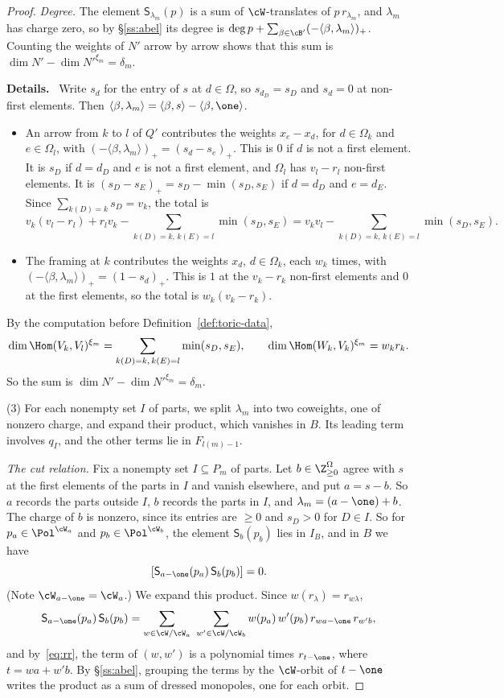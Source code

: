 \documentclass[11pt]{amsart}
\newenvironment{details}{\par\color{black!60!green}\noindent\textbf{Details.}\ }{\par}
\begin{document}
\begin{proof}
\emph{Degree.}  The element $\mathsf S_{\lambda_m}(p)$ is a sum of $\cW$-translates of
$p\,r_{\lambda_m}$, and $\lambda_m$ has charge zero, so by \S\ref{ss:abel}
its degree is $\deg p+\sum_{\beta\in\cB'}(-\langle\beta,\lambda_m\rangle)_+$.
Counting the weights of $N'$ arrow by arrow shows that this sum is
$\dim N'-\dim N'^{\xi_m}=\delta_m$.
\begin{details}
Write $s_d$ for the entry of $s$ at $d\in\Omega$, so $s_{d_D}=s_D$ and $s_d=0$
at non-first elements.  Then $\langle\beta,\lambda_m\rangle
=\langle\beta,s\rangle-\langle\beta,\one\rangle$.
\begin{itemize}[leftmargin=2em]
\item An arrow from $k$ to $l$ of $Q'$ contributes the weights $x_e-x_d$, for
$d\in\Omega_k$ and $e\in\Omega_l$, with
$(-\langle\beta,\lambda_m\rangle)_+=(s_d-s_e)_+$.  This is $0$ if $d$ is not
a first element.  It is $s_D$ if $d=d_D$ and $e$ is not a first element, and
$\Omega_l$ has $v_l-r_l$ non-first elements.  It is
$(s_D-s_E)_+=s_D-\min(s_D,s_E)$ if $d=d_D$ and $e=d_E$.  Since
$\sum_{k(D)=k}s_D=v_k$, the total is
\[
 v_k(v_l-r_l)+r_lv_k-\sum_{k(D)=k,\,k(E)=l}\min(s_D,s_E)
 =v_kv_l-\sum_{k(D)=k,\,k(E)=l}\min(s_D,s_E).
\]
\item The framing at $k$ contributes the weights $x_d$, $d\in\Omega_k$, each
$w_k$ times, with $(-\langle\beta,\lambda_m\rangle)_+=(1-s_d)_+$.  This is $1$
at the $v_k-r_k$ non-first elements and $0$ at the first elements, so the
total is $w_k(v_k-r_k)$.
\end{itemize}
By the computation before Definition~\ref{def:toric-data},
\[
 \dim\Hom(V_k,V_l)^{\xi_m}=\sum_{k(D)=k,\,k(E)=l}\min(s_D,s_E),\qquad
 \dim\Hom(W_k,V_k)^{\xi_m}=w_kr_k .
\]
So the sum is $\dim N'-\dim N'^{\xi_m}=\delta_m$.
\end{details}

(3) For each nonempty set $I$ of parts, we split $\lambda_m$ into two
coweights, one of nonzero charge, and expand their product, which vanishes in
$B$.  Its leading term involves $q_I$, and the other terms lie in
$F_{l(m)-1}$.

\emph{The cut relation.}  Fix a nonempty set $I\subseteq P_m$ of parts.  Let $b\in\Z^\Omega_{\ge0}$
agree with $s$ at the first elements of the parts in $I$ and vanish
elsewhere, and put $a=s-b$.  So $a$ records the parts outside $I$, $b$ records
the parts in $I$, and $\lambda_m=(a-\one)+b$.  The charge of $b$ is nonzero,
since its entries are $\ge0$ and $s_D>0$ for $D\in I$.  So for
$p_a\in\Pol^{\cW_a}$ and $p_b\in\Pol^{\cW_b}$, the element
$\mathsf S_b(p_b)$ lies in $I_B$, and in $B$ we have
\begin{equation}\label{eq:cutrel}
 [\mathsf S_{a-\one}(p_a)\,\mathsf S_b(p_b)]=0.
\end{equation}
(Note $\cW_{a-\one}=\cW_a$.)  We expand this product.  Since
$w(r_\lambda)=r_{w\lambda}$,
\[
 \mathsf S_{a-\one}(p_a)\,\mathsf S_b(p_b)
 =\sum_{w\in\cW/\cW_a}\ \sum_{w'\in\cW/\cW_b}w(p_a)\,w'(p_b)\,
 r_{wa-\one}\,r_{w'b},
\]
and by~\eqref{eq:rr}, the term of $(w,w')$ is a polynomial times $r_{t-\one}$,
where $t=wa+w'b$.  By \S\ref{ss:abel}, grouping the terms by the
$\cW$-orbit of $t-\one$ writes the product as a sum of dressed monopoles, one
for each orbit.


\end{proof}
\end{document}
